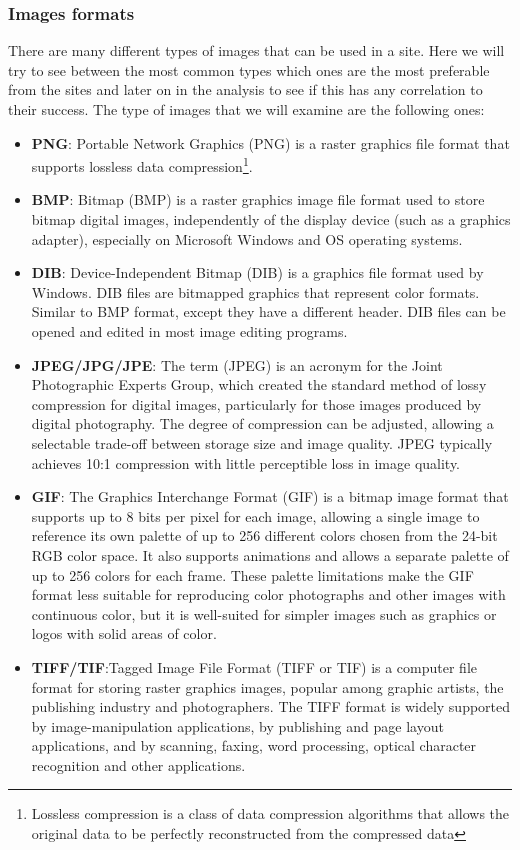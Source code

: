 \documentclass{book}
\begin{document}
\subsubsection{Images formats}
There are many different types of images that can be used in a site. Here we will try to see between the most common types which ones are the most preferable from the sites and later on in the analysis to see if this has any correlation to their success. The type of images that we will examine are the following ones:
\begin{itemize}
\item \textbf{PNG}: Portable Network Graphics (PNG) is a raster graphics file format that supports lossless data compression\footnote{Lossless compression is a class of data compression algorithms that allows the original data to be perfectly reconstructed from the compressed data}.
\item \textbf{BMP}: Bitmap (BMP) is a raster graphics image file format used to store bitmap digital images, independently of the display device (such as a graphics adapter), especially on Microsoft Windows and OS operating systems.
\item \textbf{DIB}: Device-Independent Bitmap (DIB) is a graphics file format used by Windows. DIB files are bitmapped graphics that represent color formats. Similar to BMP format, except they have a different header. DIB files can be opened and edited in most image editing programs.
\item \textbf{JPEG/JPG/JPE}: The term (JPEG) is an acronym for the Joint Photographic Experts Group, which created the standard method of lossy compression for digital images, particularly for those images produced by digital photography. The degree of compression can be adjusted, allowing a selectable trade-off between storage size and image quality. JPEG typically achieves 10:1 compression with little perceptible loss in image quality.
\item \textbf{GIF}: The Graphics Interchange Format (GIF) is a bitmap image format that supports up to 8 bits per pixel for each image, allowing a single image to reference its own palette of up to 256 different colors chosen from the 24-bit RGB color space. It also supports animations and allows a separate palette of up to 256 colors for each frame. These palette limitations make the GIF format less suitable for reproducing color photographs and other images with continuous color, but it is well-suited for simpler images such as graphics or logos with solid areas of color.
\item \textbf{TIFF/TIF}:Tagged Image File Format (TIFF or TIF) is a computer file format for storing raster graphics images, popular among graphic artists, the publishing industry and photographers. The TIFF format is widely supported by image-manipulation applications, by publishing and page layout applications, and by scanning, faxing, word processing, optical character recognition and other applications.
\end{itemize}
\end{document}

